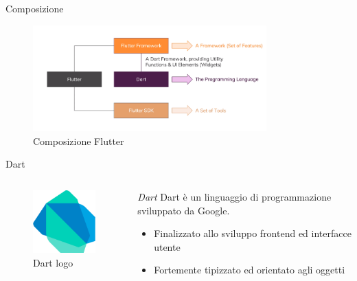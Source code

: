 \documentclass{../libs/presentation_format}
\begin{document}

\begin{frame}{Composizione}
	\begin{figure}[htpb]
		\centering
		\includegraphics[width=9cm]{../libs/flutter-composition}
		\caption{Composizione Flutter}
		\label{fig: Composizione Flutter}
	\end{figure}
\end{frame}


\begin{frame}{Dart}
	\begin{minipage}[0.2\textheight]{\textwidth}
		\begin{columns}[T]
			\begin{column}{0.4\textwidth}
				\begin{figure}[htpb]
					\centering
					\includegraphics[width=4cm]{../libs/dart-logo.png}
					\caption{Dart logo}
					\label{fig:Dart logo}
				\end{figure}
			\end{column}
			\begin{column}{0.6\textwidth}
				\emph{Dart}
				\newline
				Dart è un linguaggio di programmazione sviluppato da Google.
				\begin{itemize}
					\item Finalizzato allo sviluppo frontend ed interfacce utente
					\item Fortemente tipizzato ed orientato agli oggetti
				\end{itemize}
			\end{column}
		\end{columns}
	\end{minipage}
\end{frame}
\end{document}
